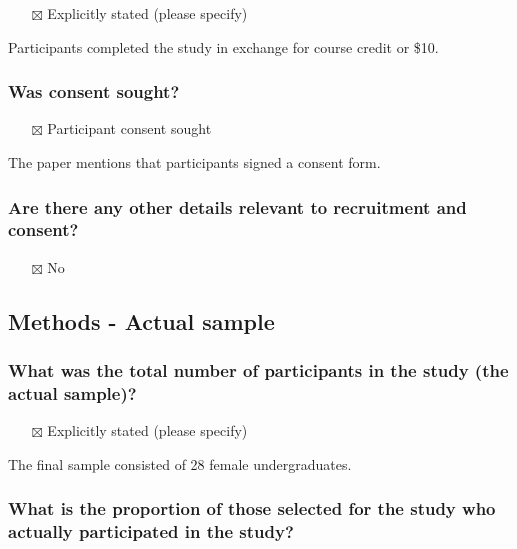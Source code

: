 \documentclass[
  doc, a4paper]{apa7}
\providecommand{\tightlist}{%
  \setlength{\itemsep}{0pt}\setlength{\parskip}{0pt}}
\begin{document}
\begin{itemize}
\tightlist
\item[$\boxtimes$]
  Explicitly stated (please specify)
\end{itemize}

Participants completed the study in exchange for course credit or \$10.

\subsubsection{Was consent sought?}\label{was-consent-sought}

\begin{itemize}
\tightlist
\item[$\boxtimes$]
  Participant consent sought
\end{itemize}

The paper mentions that participants signed a consent form.

\subsubsection{Are there any other details relevant to recruitment and consent?}\label{are-there-any-other-details-relevant-to-recruitment-and-consent}

\begin{itemize}
\tightlist
\item[$\boxtimes$]
  No
\end{itemize}

\subsection{Methods - Actual sample}\label{methods---actual-sample}

\subsubsection{What was the total number of participants in the study (the actual sample)?}\label{what-was-the-total-number-of-participants-in-the-study-the-actual-sample}

\begin{itemize}
\tightlist
\item[$\boxtimes$]
  Explicitly stated (please specify)
\end{itemize}

The final sample consisted of 28 female undergraduates.

\subsubsection{What is the proportion of those selected for the study who actually participated in the study?}\label{what-is-the-proportion-of-those-selected-for-the-study-who-actually-participated-in-the-study}
\end{document}
